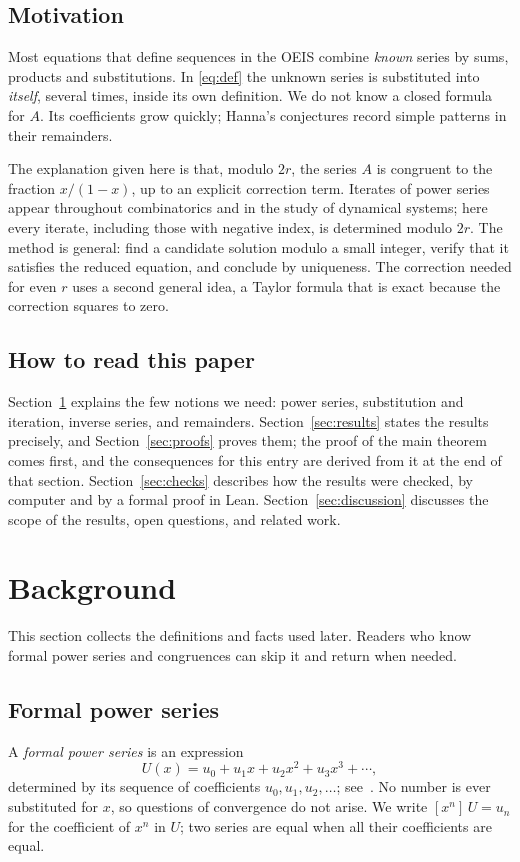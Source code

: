 \documentclass[11pt,a4paper]{article}
\theoremstyle{definition}
\theoremstyle{remark}
\newcommand{\coeff}[2]{[x^{#1}]\,#2}
\begin{document}
\subsection{Motivation}
Most equations that define sequences in the OEIS combine \emph{known} series by sums, products and substitutions.
In \eqref{eq:def} the unknown series is substituted into \emph{itself}, several times, inside its own definition.
We do not know a closed formula for $A$. Its coefficients grow quickly; Hanna's conjectures record simple patterns in
their remainders.

The explanation given here is that, modulo $2r$, the series $A$ is congruent to the fraction $x/(1-x)$, up to an
explicit correction term. Iterates of power series appear throughout combinatorics and in the study of dynamical
systems; here every iterate, including those with negative index, is determined modulo $2r$. The method is general:
find a candidate solution modulo a small integer, verify that it satisfies the reduced equation, and conclude by
uniqueness. The correction needed for
even $r$ uses a second general idea, a Taylor formula that is exact because the correction squares to zero.

\subsection{How to read this paper}
Section~\ref{sec:background} explains the few notions we need: power series, substitution and iteration, inverse
series, and remainders. Section~\ref{sec:results} states the results precisely, and Section~\ref{sec:proofs} proves
them; the proof of the main theorem comes first, and the consequences for this entry are derived from it at the end of
that section. Section~\ref{sec:checks} describes how the results were checked, by computer and by a formal proof in
Lean. Section~\ref{sec:discussion} discusses the scope of the results, open questions, and related work.
\section{Background}\label{sec:background}
This section collects the definitions and facts used later. Readers who know formal power series and congruences can skip it and return when needed.
\subsection{Formal power series}
A \emph{formal power series} is an expression
\[
U(x)=u_0+u_1x+u_2x^2+u_3x^3+\cdots ,
\]
determined by its sequence of coefficients $u_0,u_1,u_2,\dots$; see~\cite{niven,stanley}. No number is ever
substituted for $x$, so questions of convergence do not arise. We write $\coeff{n}{U}=u_n$ for the coefficient of $x^n$ in $U$; two series are equal
when all their coefficients are equal.
\end{document}
